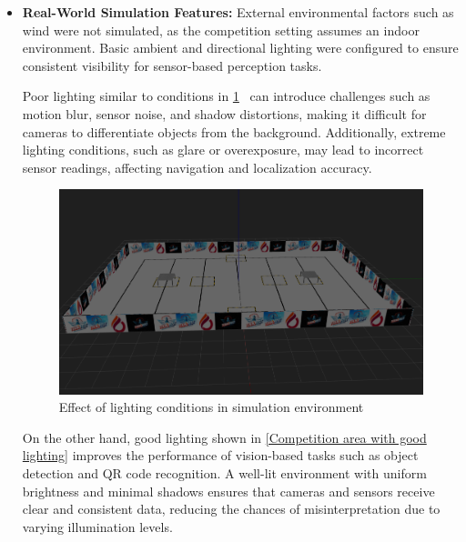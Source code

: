 \documentclass[../../main]{subfiles}
\begin{document}
\begin{itemize}
    \item \textbf{Real-World Simulation Features:} External environmental factors such as wind were not simulated,  
    as the competition setting assumes an indoor environment.  
    Basic ambient and directional lighting were configured to ensure  
    consistent visibility for sensor-based perception tasks.  
    
    Poor lighting similar to conditions in \cref{Competition area with bad lighting}~ can introduce challenges 
    such as motion blur, sensor noise, and shadow distortions,  
    making it difficult for cameras to differentiate objects from the background.  
    Additionally, extreme lighting conditions, such as glare or overexposure,  
    may lead to incorrect sensor readings, affecting navigation and localization accuracy.  
    
    \begin{figure}[H]
      \centering
  \includegraphics[width=\textwidth]{fig/competition_area_no_light.png}
  \caption{Effect of lighting conditions in simulation environment}
  \label{Competition area with bad lighting} %
  \end{figure}

    On the other hand, good lighting shown in \cref{Competition area with good lighting} improves the performance of vision-based tasks  
    such as object detection and QR code recognition.  
    A well-lit environment with uniform brightness and minimal shadows  
    ensures that cameras and sensors receive clear and consistent data,  
    reducing the chances of misinterpretation due to varying illumination levels. 
   

\end{itemize}
\end{document}

